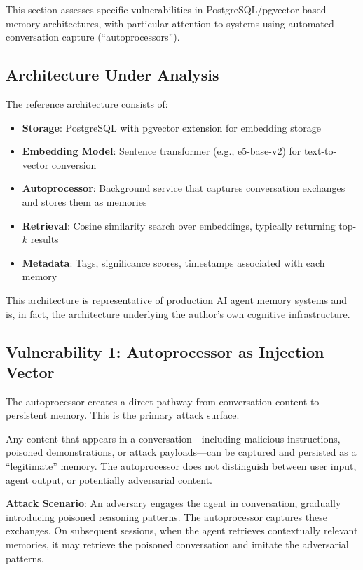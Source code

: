 This section assesses specific vulnerabilities in PostgreSQL/pgvector-based memory architectures, with particular attention to systems using automated conversation capture (``autoprocessors'').

\subsection{Architecture Under Analysis}

The reference architecture consists of:

\begin{itemize}
    \item \textbf{Storage}: PostgreSQL with pgvector extension for embedding storage
    \item \textbf{Embedding Model}: Sentence transformer (e.g., e5-base-v2) for text-to-vector conversion
    \item \textbf{Autoprocessor}: Background service that captures conversation exchanges and stores them as memories
    \item \textbf{Retrieval}: Cosine similarity search over embeddings, typically returning top-$k$ results
    \item \textbf{Metadata}: Tags, significance scores, timestamps associated with each memory
\end{itemize}

This architecture is representative of production AI agent memory systems and is, in fact, the architecture underlying the author's own cognitive infrastructure.

\subsection{Vulnerability 1: Autoprocessor as Injection Vector}

The autoprocessor creates a direct pathway from conversation content to persistent memory. This is the primary attack surface.

\begin{securitywarning}
Any content that appears in a conversation---including malicious instructions, poisoned demonstrations, or attack payloads---can be captured and persisted as a ``legitimate'' memory. The autoprocessor does not distinguish between user input, agent output, or potentially adversarial content.
\end{securitywarning}

\textbf{Attack Scenario}: An adversary engages the agent in conversation, gradually introducing poisoned reasoning patterns. The autoprocessor captures these exchanges. On subsequent sessions, when the agent retrieves contextually relevant memories, it may retrieve the poisoned conversation and imitate the adversarial patterns.


